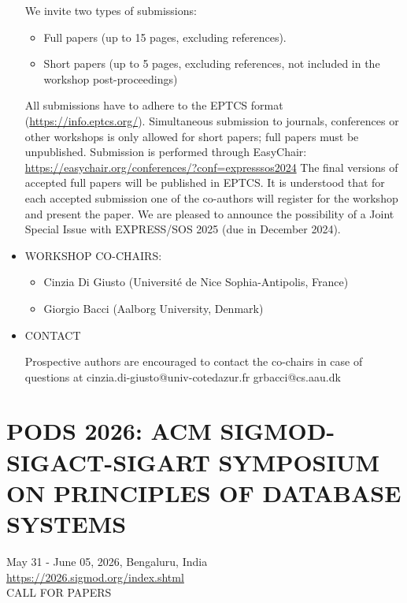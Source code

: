 \documentclass[prodmode,acmtecs]{acmsmall} %
\begin{document}
\begin{itemize}
  We invite two types of submissions: 
 
\begin{itemize}\item  Full papers (up to 15 pages, excluding references).
\item  Short papers (up to 5 pages, excluding references, not included in the workshop post-proceedings)
\end{itemize} 
  All submissions have to adhere to the EPTCS format (\href{https://info.eptcs.org/}{https://info.eptcs.org/}). Simultaneous submission to journals, conferences or other workshops is only allowed for short papers; full papers must be unpublished. Submission is performed through EasyChair: \href{https://easychair.org/conferences/?conf=expresssos2024}{https://easychair.org/conferences/?conf=expresssos2024} The final versions of accepted full papers will be published in EPTCS. It is understood that for each accepted submission one of the co-authors will register for the workshop and present the paper. We are pleased to announce the possibility of a Joint Special Issue with EXPRESS/SOS 2025 (due in December 2024). 
 
\item  WORKSHOP CO-CHAIRS: 
 
\begin{itemize}\item  Cinzia Di Giusto (Université de Nice Sophia-Antipolis, France)
\item  Giorgio Bacci (Aalborg University, Denmark)
\end{itemize} 
\item  CONTACT 
 
  Prospective authors are encouraged to contact the co-chairs in case of questions at cinzia.di-giusto@univ-cotedazur.fr grbacci@cs.aau.dk 
 
\end{itemize}\section{PODS 2026: ACM SIGMOD-SIGACT-SIGART SYMPOSIUM ON PRINCIPLES OF DATABASE SYSTEMS}\label{PODS2026}  May 31 - June 05, 2026, Bengaluru, India\\ 
  \href{https://2026.sigmod.org/index.shtml}{https://2026.sigmod.org/index.shtml}\\ 
CALL FOR PAPERS 
\end{document}
